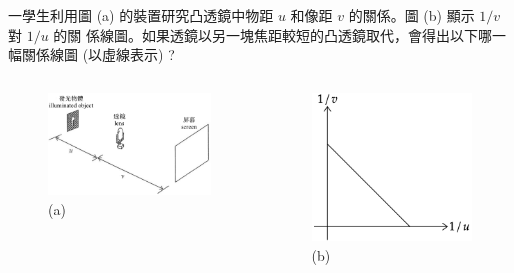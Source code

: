 \documentclass[beamer=true]{standalone}
\begin{document}
\begin{eg}
    一學生利用圖 (a) 的裝置研究凸透鏡中物距 $u$ 和像距 $v$ 的關係。圖 (b) 顯示 $1/v$ 對 $1/u$ 的關
    係線圖。如果透鏡以另一塊焦距較短的凸透鏡取代，會得出以下哪一幅關係線圖 (以虛線表示) ?\bigskip
    \begin{columns}
        \begin{figure}
            \centering
            \includegraphics[width=\linewidth]{../../assets/d980un82dun8923d23.png}
            \caption{(a)}
        \end{figure}
        \begin{figure}
            \centering
            \includegraphics[width=\linewidth]{../../assets/dm90j2d3.png}
            \caption{(b)}
        \end{figure}
    \end{columns}
\end{eg}
\end{document}
